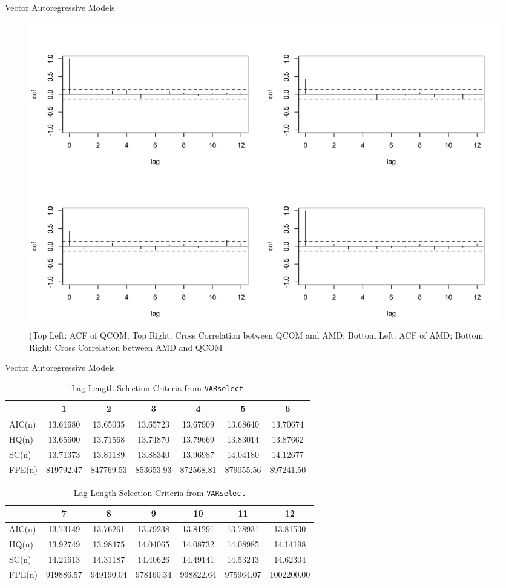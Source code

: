 \documentclass{beamer}[9pt]
\begin{document}
\begin{frame}{Vector Autoregressive Models}
	\begin{figure}[!h]
		\centering
		\includegraphics[width=0.8\linewidth]{plots/ccf_qcom_amd.png}
		\caption{(Top Left: ACF of QCOM; Top Right: Cross Correlation between QCOM and AMD; Bottom Left: ACF of AMD; Bottom Right: Cross Correlation between AMD and QCOM}
		\label{fig:ccf_qcom_amd}
	\end{figure}
\end{frame}
	
\begin{frame}{Vector Autoregressive Models}
\scriptsize
\begin{table}[ht]
	\centering
	\caption{Lag Length Selection Criteria from \texttt{VARselect}}
	\begin{tabular}{lcccccc}
		\toprule
		& \textbf{1} & \textbf{2} & \textbf{3} & \textbf{4} & \textbf{5} & \textbf{6} \\
		\midrule
		AIC(n)  & 13.61680 & 13.65035 & 13.65723 & 13.67909 & 13.68640 & 13.70674 \\
		HQ(n)   & 13.65600 & 13.71568 & 13.74870 & 13.79669 & 13.83014 & 13.87662 \\
		SC(n)   & 13.71373 & 13.81189 & 13.88340 & 13.96987 & 14.04180 & 14.12677 \\
		FPE(n)  & 819792.47 & 847769.53 & 853653.93 & 872568.81 & 879055.56 & 897241.50 \\
		\midrule
	\end{tabular}
	
	\vspace{0.5em}
	
	\begin{tabular}{lcccccc}
		\toprule
		& \textbf{7} & \textbf{8} & \textbf{9} & \textbf{10} & \textbf{11} & \textbf{12} \\
		\midrule
		AIC(n)  & 13.73149 & 13.76261 & 13.79238 & 13.81291 & 13.78931 & 13.81530 \\
		HQ(n)   & 13.92749 & 13.98475 & 14.04065 & 14.08732 & 14.08985 & 14.14198 \\
		SC(n)   & 14.21613 & 14.31187 & 14.40626 & 14.49141 & 14.53243 & 14.62304 \\
		FPE(n)  & 919886.57 & 949190.04 & 978160.34 & 998822.64 & 975964.07 & 1002200.00 \\
		\bottomrule
	\end{tabular}
	\label{tab:varselect-split}
\end{table}
\end{frame}
\end{document}
